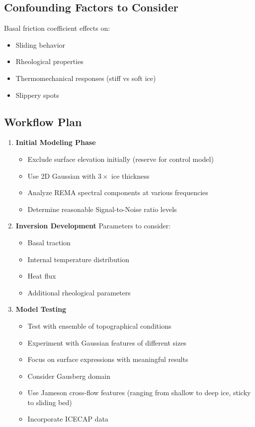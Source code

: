 \subsection*{Confounding Factors to Consider}

Basal friction coefficient effects on:
\begin{itemize}
    \item Sliding behavior
    \item Rheological properties
    \item Thermomechanical responses (stiff vs soft ice)
    \item Slippery spots
    \end{itemize}


\subsection*{Workflow Plan}

\begin{enumerate}
\item\textbf{Initial Modeling Phase}
    \begin{itemize}
    \item Exclude surface elevation initially (reserve for control model)
    \item Use 2D Gaussian with $3\times$ ice thickness
    \item Analyze REMA spectral components at various frequencies
    \item Determine reasonable Signal-to-Noise ratio levels
    \end{itemize}

\item\textbf{Inversion Development}
    Parameters to consider:
    \begin{itemize}
        \item Basal traction
        \item Internal temperature distribution
        \item Heat flux
        \item Additional rheological parameters
    \end{itemize}

\item\textbf{Model Testing}
    \begin{itemize}
    \item Test with ensemble of topographical conditions
    \item Experiment with Gaussian features of different sizes
    \item Focus on surface expressions with meaningful results
    \item Consider Gausberg domain
    \item Use Jameson cross-flow features (ranging from shallow to deep ice, sticky to sliding bed)
    \item Incorporate ICECAP data
    \end{itemize}
\end{enumerate}
